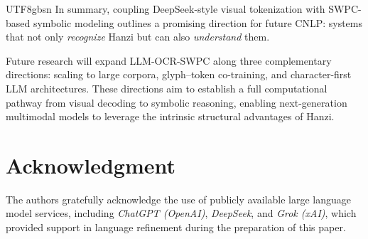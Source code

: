 \documentclass[conference]{IEEEtran}
\begin{document}
\begin{CJK*}{UTF8}{gbsn}
In summary, coupling DeepSeek-style visual tokenization with SWPC-based symbolic modeling outlines a promising direction for future CNLP: systems that not only \textit{recognize} Hanzi but can also \textit{understand} them.

Future research will expand LLM-OCR-SWPC along three complementary directions: scaling to large corpora, glyph–token co-training, and character-first LLM architectures. These directions aim to establish a full computational pathway from visual decoding to symbolic reasoning, enabling next-generation multimodal models to leverage the intrinsic structural advantages of Hanzi.

\section*{Acknowledgment}

The authors gratefully acknowledge the use of publicly available large language model services, including \textit{ChatGPT (OpenAI)}, \textit{DeepSeek}, and \textit{Grok (xAI)}, which provided support in language refinement during the preparation of this paper.





\end{CJK*}
\end{document}
